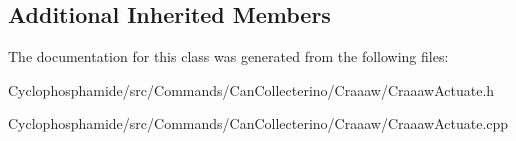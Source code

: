 \subsection*{Additional Inherited Members}


The documentation for this class was generated from the following files\+:\begin{DoxyCompactItemize}
\item 
Cyclophosphamide/src/\+Commands/\+Can\+Collecterino/\+Craaaw/Craaaw\+Actuate.\+h\item 
Cyclophosphamide/src/\+Commands/\+Can\+Collecterino/\+Craaaw/Craaaw\+Actuate.\+cpp\end{DoxyCompactItemize}
